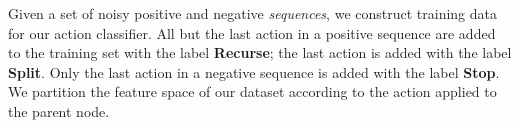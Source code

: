 
Given a set of noisy positive and negative \textit{sequences}, we construct 
  training data for our action classifier.
All but the last action in a positive sequence are added to the training set
  with the label \textbf{Recurse}; the last action is added with the label
  \textbf{Split}.
Only the last action in a negative sequence is added with the label \textbf{Stop}.
We partition the feature space of our dataset according to the action
  applied to the parent node.

%
%

